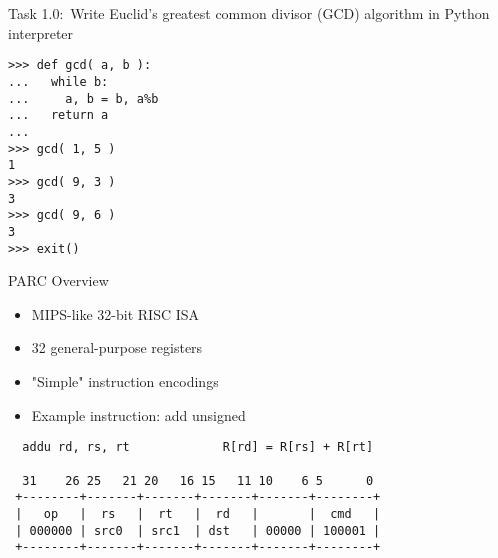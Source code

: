 
\section[{\it Hands-On} GCD Instr]{}


\begin{frame}[fragile]{\textcolor{cbxredC}{ Task 1.0:~Write
Euclid's greatest common divisor (GCD) algorithm in Python
interpreter~}}

\vspace{-20pt}

\begin{lstlisting}[numbers=none,basicstyle=\ttfamily]
% ipython
>>> def gcd( a, b ):
...   while b:
...     a, b = b, a%b
...   return a
...
>>> gcd( 1, 5 )
1
>>> gcd( 9, 3 )
3
>>> gcd( 9, 6 )
3
>>> exit()
\end{lstlisting}

\end{frame}


\begin{frame}[fragile]{PARC Overview}

\begin{itemize}
  \item MIPS-like 32-bit RISC ISA
  \item 32 general-purpose registers
  \item "Simple" instruction encodings
  \item Example instruction: add unsigned
\end{itemize}

\begin{verbatim}
  addu rd, rs, rt             R[rd] = R[rs] + R[rt]

  31    26 25   21 20   16 15   11 10    6 5      0
 +--------+-------+-------+-------+-------+--------+
 |   op   |  rs   |  rt   |  rd   |       |  cmd   |
 | 000000 | src0  | src1  | dst   | 00000 | 100001 |
 +--------+-------+-------+-------+-------+--------+

\end{verbatim}

\end{frame}

